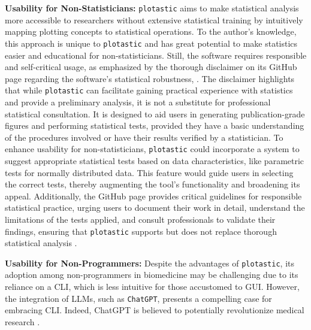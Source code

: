 \textbf{Usability for Non-Statisticians:} \texttt{plotastic} aims to make
statistical analysis more accessible to researchers without extensive
statistical training by intuitively mapping plotting concepts to statistical
operations. To the author's knowledge, this approach is unique to
\texttt{plotastic} and has great potential to make statistics easier and
educational for non-statisticians. Still, the software requires responsible and
self-critical usage, as emphasized by the thorough disclaimer on its GitHub page
regarding the software's statistical robustness,
\cite{kuricMarkur4Plotastic2024}. The disclaimer highlights that while
\texttt{plotastic} can facilitate gaining practical experience with statistics
and provide a preliminary analysis, it is not a substitute for professional
statistical consultation. It is designed to aid users in generating
publication-grade figures and performing statistical tests, provided they have a
basic understanding of the procedures involved or have their results verified by
a statistician. To enhance usability for non-statisticians, \texttt{plotastic}
could incorporate a system to suggest appropriate statistical tests based on
data characteristics, like parametric tests for normally distributed data. This
feature would guide users in selecting the correct tests, thereby augmenting the
tool's functionality and broadening its appeal. Additionally, the GitHub page
provides critical guidelines for responsible statistical practice, urging users
to document their work in detail, understand the limitations of the tests
applied, and consult professionals to validate their findings, ensuring that
\texttt{plotastic} supports but does not replace thorough statistical analysis
\cite{sandveTenSimpleRules2013, kuricMarkur4Plotastic2024}.



\textbf{Usability for Non-Programmers:}
Despite the advantages of \texttt{plotastic}, its adoption among non-programmers
in biomedicine may be challenging due to its reliance on a \ac{CLI}, which is
less intuitive for those accustomed to \ac{GUI}. However, the integration of
\acp{LLM}, such as \texttt{ChatGPT}, presents a compelling case for embracing CLI.
Indeed, ChatGPT is believed to potentially revolutionize medical research
\cite{ruksakulpiwatUsingChatGPTMedical2023}.

